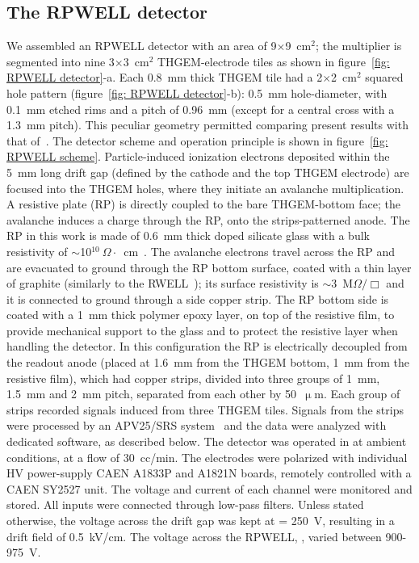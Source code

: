 \subsection{The RPWELL detector}\label{sec: RPWELL}
We assembled an RPWELL detector with an area of 9$\times$9~cm$^2$; the multiplier is segmented into nine 3$\times$3~cm$^2$ THGEM-electrode tiles as shown in figure~\ref{fig: RPWELL detector}-a. Each 0.8~mm thick THGEM tile had a 2$\times$2~cm$^2$ squared hole pattern (figure~\ref{fig: RPWELL detector}-b): 0.5~mm hole-diameter, with 0.1~mm etched rims and a pitch of 0.96~mm (except for a central cross with a 1.3~mm pitch). This peculiar geometry permitted comparing present results with that of~\cite{bressler2016first}. The detector scheme and operation principle is shown in figure~\ref{fig: RPWELL scheme}.  Particle-induced ionization electrons deposited within the 5~mm long drift gap (defined by the cathode and the top THGEM electrode) are focused into the THGEM holes, where they initiate an avalanche multiplication. A resistive plate (RP) is directly coupled to the bare THGEM-bottom face; the avalanche induces a charge through the RP, onto the strips-patterned anode.  The RP in this work is made of 0.6~mm thick doped silicate glass with a bulk resistivity of $\sim$10$^{10}~\Omega\cdot$~cm~\cite{wang2010development}. The avalanche electrons travel across the RP and are evacuated to ground through the RP bottom surface, coated with a thin layer of graphite (similarly to the RWELL~\cite{arazi2014laboratory}); its surface resistivity is $\sim$3~M$\Omega/\Box$ and it is connected to ground through a side copper strip. The RP bottom side is coated with a 1~mm thick polymer epoxy layer, on top of the resistive film, to provide mechanical support to the glass and to protect the resistive layer when handling the detector.  In this configuration the RP is electrically decoupled from the readout anode (placed at 1.6~mm from the THGEM bottom, 1~mm from the resistive film), which had copper strips, divided into three groups of 1~mm, 1.5~mm and 2~mm pitch, separated from each other by 50~$\upmu$m. Each group of strips recorded signals induced from three THGEM tiles. Signals from the strips were processed by an APV25/SRS system~\cite{martoiu2013development,french2001design} and the data were analyzed with dedicated software, as described below.
The detector was operated in \nech at ambient conditions, at a flow of 30~cc/min. The electrodes were polarized with individual HV power-supply CAEN A1833P and A1821N boards, remotely controlled with a CAEN SY2527 unit. The voltage and current of each channel were monitored and stored. All inputs were connected through low-pass filters.  Unless stated otherwise, the voltage across the drift gap was kept at \dvdrift = 250~V, resulting in a drift field of 0.5~kV/cm. The voltage across the RPWELL, \dvrpwell,  varied between 900-975~V.

